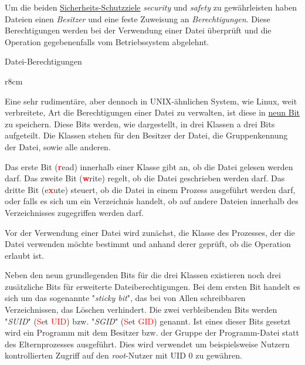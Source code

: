 \documentclass[12pt]{article}
\newcommand{\boldred}[1]{\textbf{\textcolor{red}{#1}}}
\begin{document}
Um die beiden \hyperref[sec:security_safety]{Sicherheits-Schutzziele} \emph{security} und \emph{safety} zu gewährleisten haben Dateien einen \emph{Besitzer} und eine feste Zuweisung an \emph{Berechtigungen}.
Diese Berechtigungen werden bei der Verwendung einer Datei überprüft und die Operation gegebenenfalls vom Betriebssystem abgelehnt.

\begin{defbox}{Datei-Berechtigungen}
\begin{wrapfigure}{r}{8cm}

\caption{Berechtigungs-Bits einer Datei gegliedert nach den Berechtigungsklassen}
\label{fig:filePermissions}
\end{wrapfigure}

Eine sehr rudimentäre, aber dennoch in UNIX-ähnlichen System, wie Linux, weit verbreitete, Art die Berechtigungen einer Datei zu verwalten, ist diese in \underline{neun Bit} zu speichern.
Diese Bits werden, wie  dargestellt, in drei Klassen a drei Bits aufgeteilt.
Die Klassen stehen für den Besitzer der Datei, die Gruppenkennung der Datei, sowie alle anderen.

Das erste Bit (\boldred{r}ead) innerhalb einer Klasse gibt an, ob die Datei gelesen werden darf.
Das zweite Bit (\boldred{w}rite) regelt, ob die Datei geschrieben werden darf.
Das dritte Bit (e\boldred{x}ute) steuert, ob die Datei in einem Prozess ausgeführt werden darf, oder falls es sich um ein Verzeichnis handelt, ob auf andere Dateien innerhalb des Verzeichnisses zugegriffen werden darf.

Vor der Verwendung einer Datei wird zunächst, die Klasse des Prozesses, der die Datei verwenden möchte bestimmt und anhand derer geprüft, ob die Operation erlaubt ist.
\end{defbox}

Neben den neun grundlegenden Bits für die drei Klassen existieren noch drei zusätzliche Bits für erweiterte Dateiberechtigungen.
Bei dem ersten Bit handelt es sich um das sogenannte "\emph{sticky bit}", das bei von Allen schreibbaren Verzeichnissen, das Löschen verhindert.
Die zwei verbleibenden Bits werden "\emph{SUID}" (\textcolor{red}{S}et \textcolor{red}{UID}) bzw. "\emph{SGID}" (\textcolor{red}{S}et \textcolor{red}{GID}) genannt.
Ist eines dieser Bits gesetzt wird ein Programm mit dem Besitzer bzw. der Gruppe der Programm-Datei statt des Elternprozesses ausgeführt.
Dies wird verwendet um beispielsweise Nutzern kontrollierten Zugriff auf den \emph{root}-Nutzer mit UID 0 zu gewähren.
\end{document}
